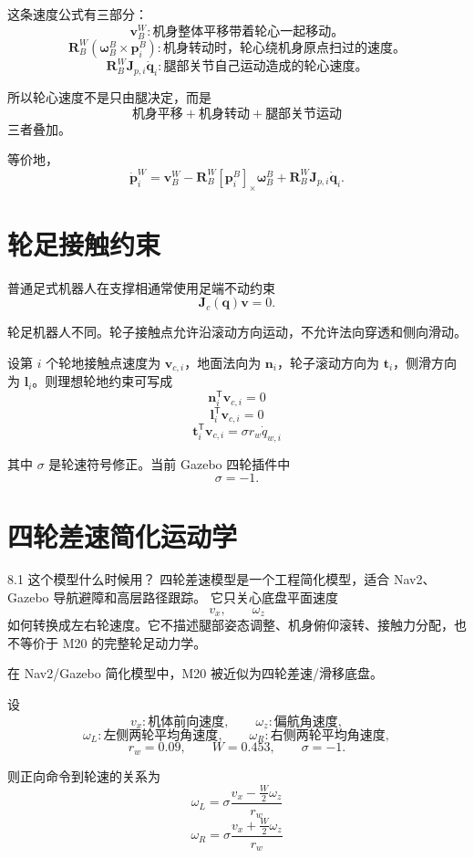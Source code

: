 \documentclass[UTF8,11pt,a4paper]{ctexart}
\newcommand{\T}{^{\mathsf T}}
\newcommand{\bs}[1]{\bm{#1}}
\newcommand{\cross}[1]{\left[#1\right]_{\times}}
\begin{document}
这条速度公式有三部分：
\[
\bs v_B^W:
\text{机身整体平移带着轮心一起移动。}
\]
\[
\bs R_B^W(\bs \omega_B^B\times \bs p_i^B):
\text{机身转动时，轮心绕机身原点扫过的速度。}
\]
\[
\bs R_B^W\bs J_{p,i}\dot{\bs q}_i:
\text{腿部关节自己运动造成的轮心速度。}
\]

所以轮心速度不是只由腿决定，而是
\[
\text{机身平移}
+\text{机身转动}
+\text{腿部关节运动}
\]
三者叠加。

等价地，
\[
\dot{\bs p}_i^W
=
\bs v_B^W
-\bs R_B^W\cross{\bs p_i^B}\bs \omega_B^B
+\bs R_B^W\bs J_{p,i}\dot{\bs q}_i.
\]

\section{轮足接触约束}

普通足式机器人在支撑相通常使用足端不动约束
\[
\bs J_c(\bs q)\bs v=0.
\]

轮足机器人不同。轮子接触点允许沿滚动方向运动，不允许法向穿透和侧向滑动。

设第 \(i\) 个轮地接触点速度为 \(\bs v_{c,i}\)，地面法向为 \(\bs n_i\)，轮子滚动方向为 \(\bs t_i\)，侧滑方向为 \(\bs l_i\)。则理想轮地约束可写成
\[
\boxed{
\bs n_i\T \bs v_{c,i}=0
}
\]
\[
\boxed{
\bs l_i\T \bs v_{c,i}=0
}
\]
\[
\boxed{
\bs t_i\T \bs v_{c,i}
=
\sigma r_w \dot q_{w,i}
}
\]

其中 \(\sigma\) 是轮速符号修正。当前 Gazebo 四轮插件中
\[
\sigma=-1.
\]

\section{四轮差速简化运动学}

\begin{orangebox}{8.1 这个模型什么时候用？}
四轮差速模型是一个工程简化模型，适合 Nav2、Gazebo 导航避障和高层路径跟踪。
它只关心底盘平面速度
\[
v_x,\qquad \omega_z
\]
如何转换成左右轮速度。它不描述腿部姿态调整、机身俯仰滚转、接触力分配，也不等价于 M20 的完整轮足动力学。
\end{orangebox}

在 Nav2/Gazebo 简化模型中，M20 被近似为四轮差速/滑移底盘。

设
\[
v_x:\text{机体前向速度},\qquad
\omega_z:\text{偏航角速度},
\]
\[
\omega_L:\text{左侧两轮平均角速度},\qquad
\omega_R:\text{右侧两轮平均角速度},
\]
\[
r_w=0.09,\qquad W=0.453,\qquad \sigma=-1.
\]

则正向命令到轮速的关系为
\[
\boxed{
\omega_L
=
\sigma\frac{v_x-\frac{W}{2}\omega_z}{r_w}
}
\]
\[
\boxed{
\omega_R
=
\sigma\frac{v_x+\frac{W}{2}\omega_z}{r_w}
}
\]
\end{document}
